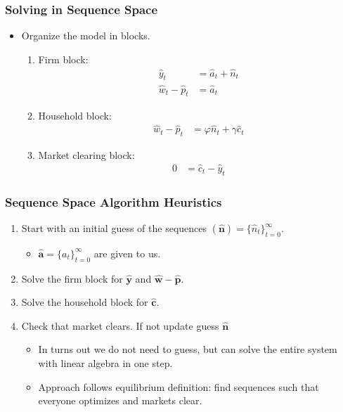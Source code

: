 \documentclass[english,xcolor=svgnames]{beamer}
\begin{document}
\begin{frame}
	\frametitle{Solving in Sequence Space}
	\begin{itemize}
		\item Organize the model in blocks.
		\begin{enumerate}
			\item Firm block:
			\begin{align*}
				\hat{y}_t&=\hat{a}_t + \hat{n}_{t}  \\
				\hat{w}_t - \hat{p}_t &= \hat{a}_t  
			\end{align*}
			\item Household block:
			\begin{align*}
				\hat{w}_t - \hat{p}_t &=\varphi \hat{n}_t + \gamma \hat{c}_t 
			\end{align*}
			\item Market clearing block:
			\begin{align*}
				0&=\hat{c}_t - \hat{y}_t 
			\end{align*}
		\end{enumerate}
	\end{itemize}
	\end{frame}

	
	\begin{frame}
		\frametitle{Sequence Space Algorithm Heuristics}
			\begin{enumerate}
				\item Start with an initial guess of the sequences $(\mathbf{\hat{n}})=\{\hat{n}_{t}\}_{t=0}^{\infty}$.
				\begin{itemize}
					\item $\mathbf{\hat{a}}=\{a_t\}_{t=0}^{\infty}$ are given to us.
				\end{itemize}
				\item Solve the firm block for $\mathbf{\hat{y}}$ and $\mathbf{\hat{w}-\hat{p}}$.
				\item Solve the household block for $\mathbf{\hat{c}}$.
				\item Check that market clears. If not update guess $\mathbf{\hat{n}}$
				\begin{itemize}
					\item In turns out we do not need to guess, but can solve the entire system with linear algebra in one step.
					\item Approach follows equilibrium definition: find sequences such that everyone optimizes and markets clear.
				\end{itemize}
			\end{enumerate}
	\end{frame}
	
\end{document}
